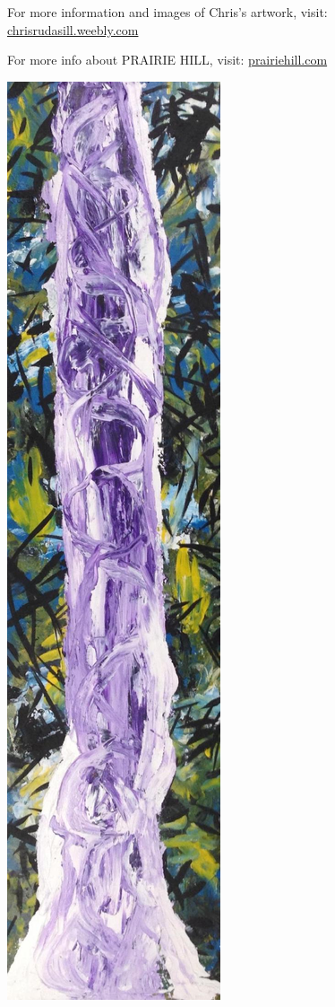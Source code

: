 \documentclass[11pt]{article}
\begin{document}
For more information and images of Chris’s artwork, visit: 
\href{http://chrisrudasill.weebly.com}{chrisrudasill.weebly.com}   

For more info about PRAIRIE HILL, visit:   
\href{http://prairiehill.com}{prairiehill.com}

\includegraphics[width=.9\linewidth]{./app/assets/images/rudasill_1.jpeg}
\end{document}
